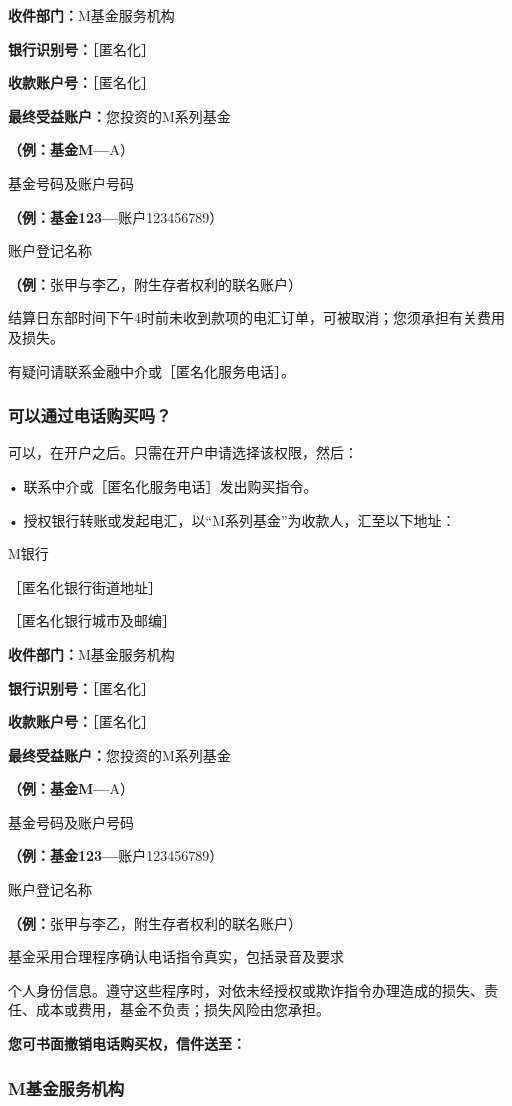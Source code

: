 \documentclass[UTF8,fontset=none,11pt,a4paper]{ctexart}
\begin{document}
\textbf{收件部门：}M基金服务机构

\textbf{银行识别号：}［匿名化］

\textbf{收款账户号：}［匿名化］

\textbf{最终受益账户：}您投资的M系列基金

\textbf{（例：基金M—}A）

基金号码及账户号码

\textbf{（例：基金123—}账户123456789）

账户登记名称

\textbf{（例：}张甲与李乙，附生存者权利的联名账户）

结算日东部时间下午4时前未收到款项的电汇订单，可被取消；您须承担有关费用及损失。

有疑问请联系金融中介或［匿名化服务电话］。

\subsubsection*{可以通过电话购买吗？}
可以，在开户之后。只需在开户申请选择该权限，然后：

\noindent • 联系中介或［匿名化服务电话］发出购买指令。\par\smallskip
\noindent • 授权银行转账或发起电汇，以“M系列基金”为收款人，汇至以下地址：\par\smallskip
M银行

［匿名化银行街道地址］

［匿名化银行城市及邮编］

\textbf{收件部门：}M基金服务机构

\textbf{银行识别号：}［匿名化］

\textbf{收款账户号：}［匿名化］

\textbf{最终受益账户：}您投资的M系列基金

\textbf{（例：基金M—}A）

基金号码及账户号码

\textbf{（例：基金123—}账户123456789）

账户登记名称

\textbf{（例：}张甲与李乙，附生存者权利的联名账户）

基金采用合理程序确认电话指令真实，包括录音及要求

个人身份信息。遵守这些程序时，对依未经授权或欺诈指令办理造成的损失、责任、成本或费用，基金不负责；损失风险由您承担。

\textbf{您可书面撤销电话购买权，信件送至：}

\subsubsection*{M基金服务机构}
\end{document}
